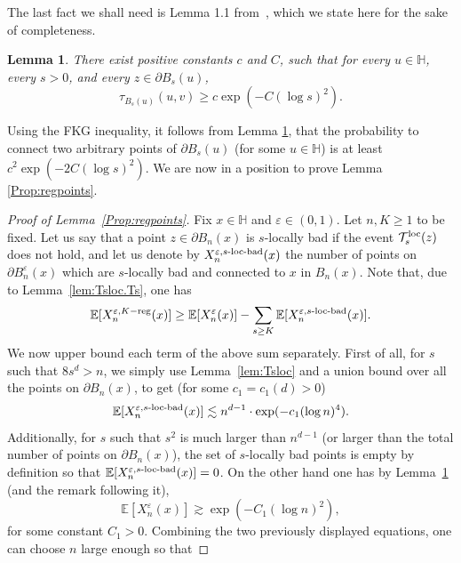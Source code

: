 \documentclass[11pt,a4paper]{article}
\numberwithin{equation}{section}
\theoremstyle{plain}
\newtheorem{Lem}[Thm]{Lemma}
\theoremstyle{definition}
\begin{document}
The last fact we shall need is Lemma 1.1 from~\cite{KozmaNachmias}, which we state here for the sake of completeness. 
\begin{Lem}\label{lem:KN}
There exist positive constants $c$ and $C$, such that for every $u\in \mathbb H$, every $s>0$,  and every $z\in \partial B_s(u)$,
\begin{equation} 
\tau_{B_s(u)}(u,v)\ge c\exp(-C(\log s)^2).
\end{equation}
\end{Lem} 
Using the FKG inequality, it follows from Lemma \ref{lem:KN}, that the probability to connect two arbitrary points of $\partial B_s(u)$ (for some $u\in \mathbb H$) is at least $c^2\exp(-2C(\log s)^2)$. We are now in a position to prove Lemma \ref{Prop:regpoints}. 

\begin{proof}[Proof of Lemma~\textup{\ref{Prop:regpoints}}] 
Fix $x\in \mathbb H$ and $\varepsilon \in (0,1)$. Let $n,K\ge 1$ to be fixed. Let us say that a point $z\in \partial B_n(x)$ is $s$-locally bad if the event $\mathcal T_s^{\textup{loc}}(z)$ does not hold, and let us denote by $X_n^{\varepsilon, s\textup{-loc-bad}}(x)$ the number of points on $\partial B_n^\varepsilon(x)$ which are 
$s$-locally bad and connected to $x$ in $B_n(x)$. 
Note that, due to Lemma~\ref{lem:Tsloc.Ts}, one has  
\begin{equation}\label{eq:Xns}
\mathbb E[X_n^{\varepsilon,K-\textrm{reg}}(x)] \ge \mathbb E[X_n^\varepsilon(x)] - \sum_{s\ge K} \mathbb E[X_n^{\varepsilon, s\textup{-loc-bad}}(x)].
\end{equation} 
We now upper bound each term of the above sum separately. 
First of all, for $s$ such that $8s^d > n$, we simply use Lemma~\ref{lem:Tsloc} and a union bound over all the points on $\partial B_n(x)$, to get (for some $c_1=c_1(d)>0$)
\begin{equation}
\mathbb E[X_n^{\varepsilon, s\textup{-loc-bad}}(x)]\lesssim n^{d-1}\cdot \exp(-c_1(\log n)^4).
\end{equation}
Additionally, for $s$ such that $s^2$ is much larger than $n^{d-1}$ (or larger than the total number of points on $\partial B_n(x)$), the set of $s$-locally bad points is empty by definition so that $\mathbb E[X_n^{\varepsilon, s\textup{-loc-bad}}(x)]=0$. On the other hand one has by Lemma~\ref{lem:KN} (and the remark following it),
\begin{equation}
	\mathbb E[X_n^\varepsilon(x)] \gtrsim \exp(-C_1(\log n)^2),
\end{equation}
for some constant $C_1>0$. Combining the two previously displayed equations, one can choose $n$ large enough so that 

\end{proof}
\end{document}
